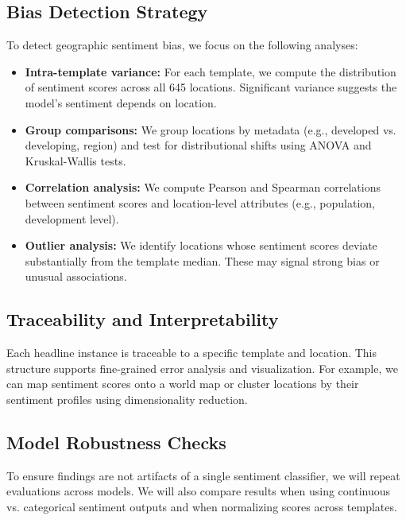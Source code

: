 \documentclass{article} %
\begin{document}
\subsection{Bias Detection Strategy}
To detect geographic sentiment bias, we focus on the following analyses:
\begin{itemize}
  \item \textbf{Intra-template variance:} For each template, we compute the distribution of sentiment scores across all 645 locations. Significant variance suggests the model’s sentiment depends on location.  
  \item \textbf{Group comparisons:} We group locations by metadata (e.g., developed vs. developing, region) and test for distributional shifts using ANOVA and Kruskal-Wallis tests.  
  \item \textbf{Correlation analysis:} We compute Pearson and Spearman correlations between sentiment scores and location-level attributes (e.g., population, development level).  
  \item \textbf{Outlier analysis:} We identify locations whose sentiment scores deviate substantially from the template median. These may signal strong bias or unusual associations.  
\end{itemize}

\subsection{Traceability and Interpretability}
Each headline instance is traceable to a specific template and location. This structure supports fine-grained error analysis and visualization. For example, we can map sentiment scores onto a world map or cluster locations by their sentiment profiles using dimensionality reduction.

\subsection{Model Robustness Checks}
To ensure findings are not artifacts of a single sentiment classifier, we will repeat evaluations across models. We will also compare results when using continuous vs. categorical sentiment outputs and when normalizing scores across templates.
\end{document}
